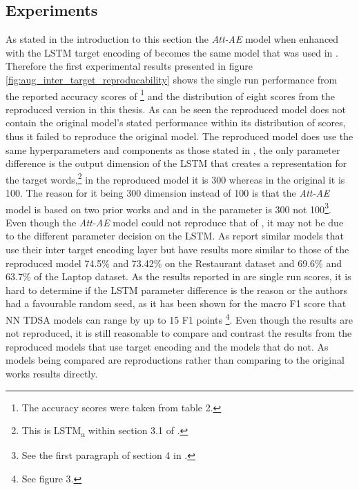 \subsection{Experiments}
As stated in the introduction to this section the \textit{Att-AE} model when enhanced with the LSTM target encoding of \citet{hazarika-etal-2018-modeling} becomes the same model that was used in \citet{hazarika-etal-2018-modeling}. Therefore the first experimental results presented in figure \ref{fig:aug_inter_target_reproducability} shows the single run performance from the reported accuracy scores of \citet{hazarika-etal-2018-modeling}\footnote{The accuracy scores were taken from table 2.} and the distribution of eight scores from the reproduced version in this thesis. As can be seen the reproduced model does not contain the original model's stated performance within its distribution of scores, thus it failed to reproduce the original model. The reproduced model does use the same hyperparameters and components as those stated in \citet{hazarika-etal-2018-modeling}, the only parameter difference is the output dimension of the LSTM that creates a representation for the target words,\footnote{This is LSTM\textsubscript{a} within section 3.1 of \citet{hazarika-etal-2018-modeling}.} in the reproduced model it is 300 whereas in the original it is 100. The reason for it being 300 dimension instead of 100 is that the \textit{Att-AE} model is based on two prior works \citet{hazarika-etal-2018-modeling} and \citet{wang-etal-2016-attention} and in \citet{wang-etal-2016-attention} the parameter is 300 not 100\footnote{See the first paragraph of section 4 in \citet{wang-etal-2016-attention}.}. Even though the \textit{Att-AE} model could not reproduce that of \citet{hazarika-etal-2018-modeling}, it may not be due to the different parameter decision on the LSTM. As \citet{hazarika-etal-2018-modeling} report similar models that use their inter target encoding layer but have results more similar to those of the reproduced model 74.5\% and 73.42\% on the Restaurant dataset and 69.6\% and 63.7\% of the Laptop dataset. As the results reported in \citet{hazarika-etal-2018-modeling} are single run scores, it is hard to determine if the LSTM parameter difference is the reason or the authors had a favourable random seed, as it has been shown for the macro F1 score that NN TDSA models can range by up to 15 F1 points \citep{moss-etal-2019-fiesta}\footnote{See figure 3.}. Even though the results are not reproduced, it is still reasonable to compare and contrast the results from the reproduced models that use target encoding and the models that do not. As models being compared are reproductions rather than comparing to the original works results directly. 

